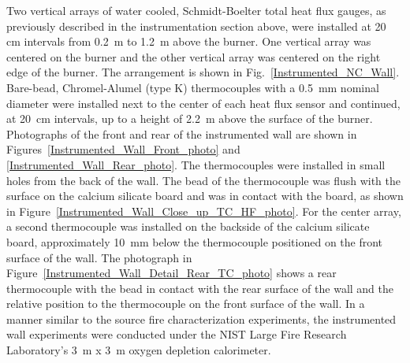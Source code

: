 \documentclass[twoside]{uocthesis}
\begin{document}
{Two vertical arrays of water cooled, Schmidt-Boelter total heat flux gauges, as previously described in the instrumentation section above, were installed at 20 cm intervals from 0.2~m to 1.2~m above the burner.  One vertical array was centered on the burner and the other vertical array was centered on the right edge of the burner. The arrangement is shown in Fig.~\ref{Instrumented_NC_Wall}. Bare-bead, Chromel-Alumel (type K) thermocouples with a 0.5~mm nominal diameter were installed next to the center of each heat flux sensor and continued, at 20~cm intervals, up to a height of 2.2~m above the surface of the burner. Photographs of the front and rear of the instrumented wall are shown in Figures~\ref{Instrumented_Wall_Front_photo} and \ref{Instrumented_Wall_Rear_photo}. The thermocouples were installed in small holes from the back of the wall.  The bead of the thermocouple was flush with the surface on the calcium silicate board and was in contact with the board, as shown in Figure~\ref{Instrumented_Wall_Close_up_TC_HF_photo}.  For the center array, a second thermocouple was installed on the backside of the calcium silicate board, approximately 10~mm below the thermocouple positioned on the front surface of the wall. The photograph in Figure~\ref{Instrumented_Wall_Detail_Rear_TC_photo} shows a rear thermocouple with the bead in contact with the rear surface of the wall and the relative position to the thermocouple on the front surface of the wall. In a manner similar to the source fire characterization experiments, the instrumented wall experiments were conducted under the NIST Large Fire Research Laboratory's 3~m x 3~m oxygen depletion calorimeter.

}
\end{document}
